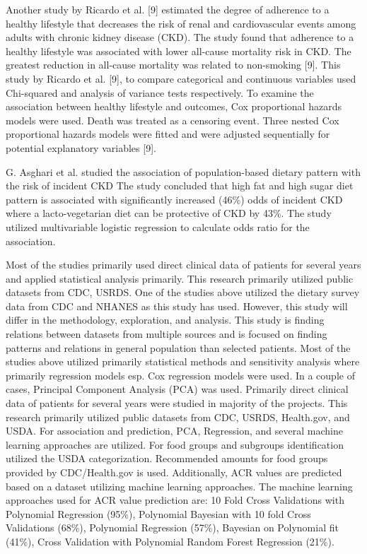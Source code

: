 \medskip
\noindent Another study by Ricardo et al. [9] estimated the degree of adherence to a healthy lifestyle that decreases the risk of renal and cardiovascular events among adults with chronic kidney disease (CKD). The study found that adherence to a healthy lifestyle was associated with lower all-cause mortality risk in CKD. The greatest reduction in all-cause mortality was related to non-smoking [9]. This study by Ricardo et al. [9], to compare categorical and continuous variables used Chi-squared and analysis of variance tests respectively. To examine the association between healthy lifestyle and outcomes, Cox proportional hazards models were used. Death was treated as a censoring event. Three nested Cox proportional hazards models were fitted and were adjusted sequentially for potential explanatory variables [9].

\medskip
\noindent G. Asghari et al. studied the association of population-based dietary pattern with the risk of incident CKD The study concluded that high fat and high sugar diet pattern is associated with significantly increased (46\%) odds of incident CKD where a lacto-vegetarian diet can be protective of CKD by 43\%. The study utilized multivariable logistic regression to calculate odds ratio for the association.

\medskip
\noindent  Most of the studies primarily used direct clinical data of patients for several years and applied statistical analysis primarily. This research primarily utilized public datasets from CDC, USRDS.  One of the studies above utilized the dietary survey data from CDC and NHANES as this study has used. However, this study will differ in the methodology, exploration, and analysis. This study is finding relations between datasets from multiple sources and is focused on finding patterns and relations in general population than selected patients. Most of the studies above utilized primarily statistical methods and sensitivity analysis where primarily regression models esp. Cox regression models were used. In a couple of cases, Principal Component Analysis (PCA) was used. Primarily direct clinical data of patients for several years were studied in majority of the projects.  This research primarily utilized public datasets from CDC, USRDS, Health.gov, and USDA. For association and prediction, PCA, Regression, and several machine learning approaches are utilized. For food groups and subgroups  identification utilized the USDA categorization. Recommended amounts for food groups provided by CDC/Health.gov is used. Additionally, ACR values are predicted based on a dataset utilizing machine learning approaches.  The machine learning approaches used for ACR value prediction are: 10 Fold Cross Validations with Polynomial Regression (95\%), Polynomial Bayesian with 10 fold Cross Validations (68\%), Polynomial Regression (57\%), Bayesian on Polynomial fit (41\%), Cross Validation with Polynomial Random Forest Regression (21\%).